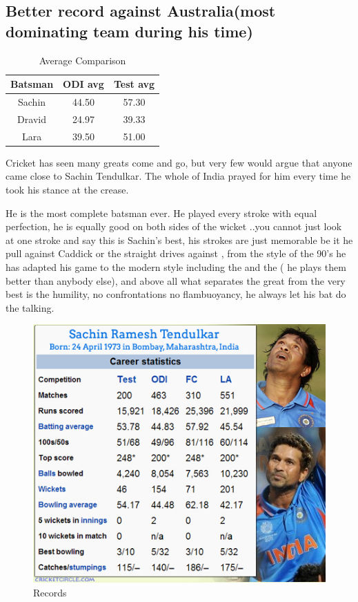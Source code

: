 \documentclass[12pt,twocolumn ]{article}
\begin{document}
\subsection{Better record against Australia(most dominating team during his time)}
\begin{table}[h]
    \centering
    \begin{tabular}{|c|c|c|}
    \hline
     Batsman & ODI avg & Test avg\\
    \hline
     Sachin  & 44.50 & 57.30\\
     \hline
     Dravid & 24.97 & 39.33\\
     \hline
     Lara & 39.50 & 51.00\\
     \hline
\end{tabular}
    \caption{Average Comparison}
    \label{tab:my_label}
\end{table}
\par Cricket has seen many greats come and go, but very few would argue that anyone came close to Sachin Tendulkar. The whole of India prayed for him every time he took his stance at the crease\cite{siddhartha}.
\par He is the most complete batsman ever. He played every stroke with equal perfection, he is equally good on both sides of the wicket ..you cannot just look at one stroke and say this is Sachin's best, his strokes are just memorable be it he pull against Caddick  or the straight drives  against , from the  style of the 90's he has adapted his game to the modern style including the  and the ( he plays them better than anybody else), and above all what separates the great from the very best is the humility, no confrontations no flambuoyancy, he always let his bat do the talking\cite{harsha}.
\begin{figure}[h]
        \begin{center}
                \includegraphics[scale=0.7]{sachin-career}
        \end{center}
        \caption{Records}
        \label{fig:shapes}
\end{figure}
\newpage
\printindex
\medskip


\end{document}
